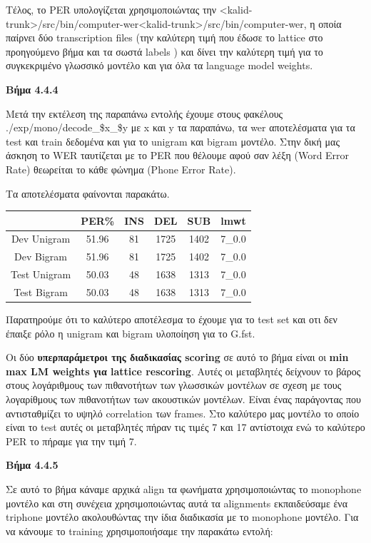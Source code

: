 \documentclass[12pt]{article}
\begin{document}
Τέλος, το PER υπολογίζεται χρησιμοποιώντας την 
<kalid-trunk>/src/bin/computer-wer<kalid-trunk>/src/bin/computer-wer, 
η οποία παίρνει δύο transcription files (την καλύτερη τιμή που έδωσε το lattice στο προηγούμενο βήμα και τα σωστά labels ) και δίνει την καλύτερη τιμή για το συγκεκριμένο γλωσσικό μοντέλο και για όλα τα language model weights. 

\textbf{Βήμα 4.4.4}

Μετά την εκτέλεση της παραπάνω εντολής  έχουμε στους φακέλους ./exp/mono/decode\_\${x}\_\${y} με x και y τα παραπάνω, τα wer αποτελέσματα για τα test και train δεδομένα και για το unigram και bigram μοντέλο. Στην δική μας άσκηση το WER ταυτίζεται με το PER που θέλουμε αφού σαν λέξη (Word Error Rate) θεωρείται το κάθε φώνημα (Phone Error Rate).

Τα αποτελέσματα φαίνονται παρακάτω.

\begin{center}
\begin{tabular}{ |c|c|c|c|c|c| } 
 \hline
    &PER\% & INS & DEL & SUB & lmwt\\
 \hline 
 Dev Unigram & 51.96 & 81 & 1725 & 1402 & 7\_0.0 \\
\hline 
 Dev Bigram & 51.96 & 81 & 1725 & 1402 & 7\_0.0 \\
\hline 
 Test Unigram & 50.03 & 48 & 1638 & 1313 & 7\_0.0\\
\hline 
 Test Bigram & 50.03 & 48 & 1638 & 1313 & 7\_0.0\\
\hline 
\end{tabular}
\end{center}

Παρατηρούμε ότι το καλύτερο αποτέλεσμα το έχουμε για το test set και οτι δεν έπαιξε ρόλο η unigram και bigram υλοποίηση για το G.fst. 

Οι δύο \textbf{υπερπαράμετροι της διαδικασίας scoring} σε αυτό το βήμα είναι οι \textbf{min max LM weights για lattice rescoring}. Αυτές οι μεταβλητές δείχνουν το βάρος στους λογάριθμους των πιθανοτήτων των γλωσσικών μοντέλων σε σχεση με τους λογαρίθμους των πιθανοτήτων των ακουστικών μοντέλων. Είναι ένας παράγοντας που αντισταθμίζει το υψηλό correlation των frames. Στο καλύτερο μας μοντέλο το οποίο είναι το test αυτές οι μεταβλητές πήραν τις τιμές 7 και 17 αντίστοιχα ενώ το καλύτερο PER το πήραμε για την τιμή 7.

\textbf{Βήμα 4.4.5}

Σε αυτό το βήμα κάναμε αρχικά align τα φωνήματα χρησιμοποιώντας το monophone μοντέλο και στη συνέχεια χρησιμοποιώντας αυτά τα alignments εκπαιδεύσαμε ένα triphone μοντέλο ακολουθώντας την ίδια διαδικασία με το monophone μοντέλο.
Για να κάνουμε το training χρησιμοποιήσαμε την παρακάτω εντολή:
\end{document}
